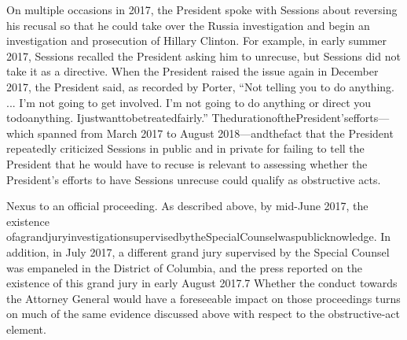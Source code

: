 On multiple occasions in 2017, the President spoke with Sessions about reversing his recusal so that he could take over the Russia investigation and begin an investigation and prosecution of Hillary Clinton. For example, in early summer 2017, Sessions recalled the President asking him to unrecuse, but Sessions did not take it as a directive. When the President raised the issue again in December 2017, the President said, as recorded by Porter, “Not telling you to do anything. ... I'm not going to get involved. I'm not going to do anything or direct you todoanything. Ijustwanttobetreatedfairly.” ThedurationofthePresident'sefforts—which spanned from March 2017 to August 2018—andthefact that the President repeatedly criticized Sessions in public and in private for failing to tell the President that he would have to recuse is relevant to assessing whether the President's efforts to have Sessions unrecuse could qualify as obstructive acts.

Nexus to an official proceeding. As described above, by mid-June 2017, the existence ofagrandjuryinvestigationsupervisedbytheSpecialCounselwaspublicknowledge. In addition, in July 2017, a different grand jury supervised by the Special Counsel was empaneled in the District of Columbia, and the press reported on the existence of this grand jury in early August 2017.7 Whether the conduct towards the Attorney General would have a foreseeable impact on those proceedings turns on much of the same evidence discussed above with respect to the obstructive-act element.

